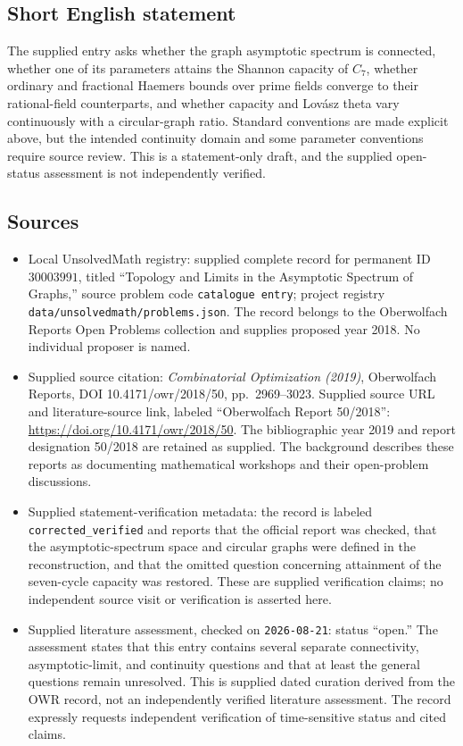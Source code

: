 \documentclass[11pt]{article}
\begin{document}
\subsection{Short English statement}
The supplied entry asks whether the graph asymptotic spectrum is connected, whether one of its parameters attains the Shannon capacity of \(C_7\), whether ordinary and fractional Haemers bounds over prime fields converge to their rational-field counterparts, and whether capacity and Lov\'asz theta vary continuously with a circular-graph ratio. Standard conventions are made explicit above, but the intended continuity domain and some parameter conventions require source review. This is a statement-only draft, and the supplied open-status assessment is not independently verified.
\subsection{Sources}
\begin{itemize}
\item Local UnsolvedMath registry: supplied complete record for permanent ID \(30003991\), titled ``Topology and Limits in the Asymptotic Spectrum of Graphs,'' source problem code \texttt{catalogue entry}; project registry \texttt{data/unsolvedmath/problems.json}. The record belongs to the Oberwolfach Reports Open Problems collection and supplies proposed year 2018. No individual proposer is named.
\item Supplied source citation: \emph{Combinatorial Optimization (2019)}, Oberwolfach Reports, DOI 10.4171/owr/2018/50, pp.\ 2969--3023. Supplied source URL and literature-source link, labeled ``Oberwolfach Report 50/2018'': \url{https://doi.org/10.4171/owr/2018/50}. The bibliographic year 2019 and report designation 50/2018 are retained as supplied. The background describes these reports as documenting mathematical workshops and their open-problem discussions.
\item Supplied statement-verification metadata: the record is labeled \texttt{corrected\_verified} and reports that the official report was checked, that the asymptotic-spectrum space and circular graphs were defined in the reconstruction, and that the omitted question concerning attainment of the seven-cycle capacity was restored. These are supplied verification claims; no independent source visit or verification is asserted here.
\item Supplied literature assessment, checked on \texttt{2026-08-21}: status ``open.'' The assessment states that this entry contains several separate connectivity, asymptotic-limit, and continuity questions and that at least the general questions remain unresolved. This is supplied dated curation derived from the OWR record, not an independently verified literature assessment. The record expressly requests independent verification of time-sensitive status and cited claims.
\end{itemize}
\end{document}

